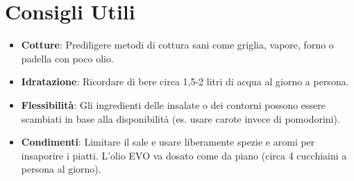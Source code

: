 \documentclass[a4paper, 11pt]{article}
\begin{document}
\section*{Consigli Utili}
\begin{itemize}
    \item \textbf{Cotture}: Prediligere metodi di cottura sani come griglia, vapore, forno o padella con poco olio.
    \item \textbf{Idratazione}: Ricordare di bere circa 1,5-2 litri di acqua al giorno a persona.
    \item \textbf{Flessibilità}: Gli ingredienti delle insalate o dei contorni possono essere scambiati in base alla disponibilità (es. usare carote invece di pomodorini).
    \item \textbf{Condimenti}: Limitare il sale e usare liberamente spezie e aromi per insaporire i piatti. L'olio EVO va dosato come da piano (circa 4 cucchiaini a persona al giorno).
\end{itemize}
\end{document}
